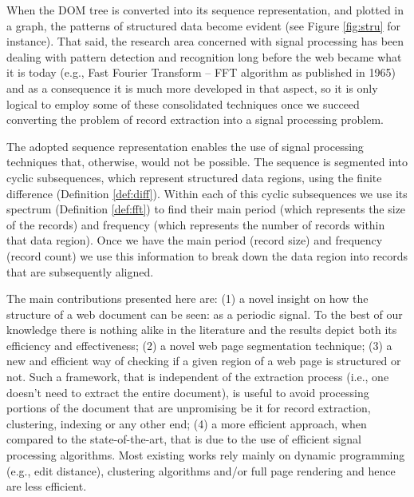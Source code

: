 When the DOM tree is converted into its sequence representation, and plotted in
a graph, the patterns of structured data become evident (see Figure
\ref{fig:stru} for instance). That said, the research area concerned with signal
processing has been dealing with pattern detection and recognition long before
the web became what it is today (e.g., Fast Fourier Transform --
FFT\cite{fft1965} algorithm as published in 1965) and as a consequence it is
much more developed in that aspect, so it is only logical to employ some of
these consolidated techniques once we succeed converting the problem of
record extraction into a signal processing problem.

The adopted sequence representation enables the use of signal processing
techniques that, otherwise, would not be possible. The sequence is segmented
into cyclic subsequences, which represent structured data regions, using the
finite difference (Definition \ref{def:diff}). Within each of this cyclic
subsequences we use its spectrum (Definition \ref{def:fft}) to find their main
period (which represents the size of the records) and frequency (which
represents the number of records within that data region). Once we have the
main period (record size) and frequency (record count) we use this information
to break down the data region into records that are subsequently aligned.

The main contributions presented here are:
	(1) a novel insight on how the structure of a web document can be seen: as
    a periodic signal. To the best of our knowledge there is nothing alike in
    the literature and the results depict both its efficiency and effectiveness;
    (2) a novel web page segmentation technique;
    (3) a new and efficient way of checking if a given region of a web page is
    structured or not. Such a framework, that is independent of the extraction
    process (i.e., one doesn't need to extract the entire document), is useful
    to avoid processing portions of the document that are unpromising be it for
    record extraction, clustering, indexing or any other end;
    (4) a more efficient approach, when compared to the state-of-the-art,
    that is due to the use of efficient signal processing algorithms. Most
    existing works rely mainly on dynamic programming (e.g., edit distance), clustering
    algorithms and/or full page rendering and hence are less efficient.

